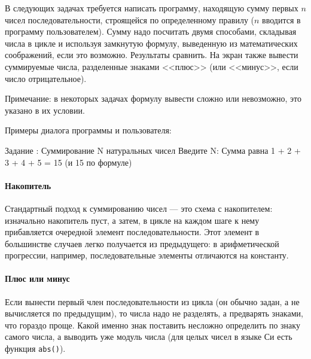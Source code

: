 
В следующих задачах требуется написать программу, находящую сумму первых $n$
чисел последовательности, строящейся по определенному правилу ($n$ вводится в программу
пользователем). Сумму надо посчитать двумя способами, складывая числа в цикле и
используя замкнутую формулу, выведенную из математических соображений, если это возможно. %
Результаты сравнить. На экран также вывести
суммируемые числа, разделенные знаками <<плюс>> (или <<минус>>, если число
отрицательное).

Примечание: в некоторых задачах формулу вывести сложно или невозможно, это
указано в их условии. %

Примеры диалога программы и пользователя:

\begin{zzoutput}
  Задание : Суммирование N натуральных чисел
  Введите N: 
  Сумма равна 1 + 2 + 3 + 4 + 5 = 15 (и 15 по формуле)
\end{zzoutput}


\zzsectionCOMMENTS

\paragraph{Накопитель}
Стандартный подход к суммированию чисел --- это схема с накопителем: изначально
накопитель пуст, а затем, в цикле на каждом шаге к нему прибавляется очередной
элемент последовательности. Этот элемент в большинстве случаев легко получается
из предыдущего: в арифметической прогрессии, например, последовательные элементы
отличаются на константу.

\paragraph{Плюс или минус}
Если вынести первый член последовательности из цикла (он обычно задан, а не
вычисляется по предыдущим), то числа надо не разделять, а предварять знаками,
что гораздо проще. Какой именно знак поставить несложно определить по знаку
самого числа, а выводить уже модуль числа (для целых чисел в языке Си есть
функция \texttt{abs()}).


